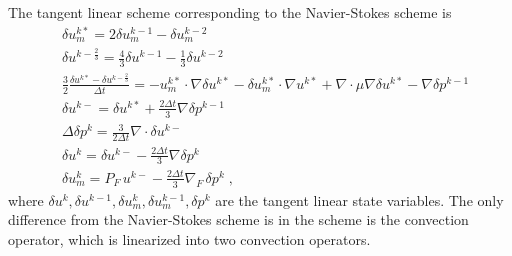 The tangent linear scheme corresponding to the Navier-Stokes scheme is
\begin{equation} \begin{split} \label{tangentscheme}
 &  \delta u_m^{k*} = 2 \delta u_m^{k-1} - \delta u_m^{k-2} \\
 &  \delta u^{k-\frac23} = \frac43 \delta u^{k-1} - \frac13 \delta u^{k-2} \\
 &  \frac32 \frac{\delta u^{k*} - \delta u^{k-\frac23}}{\Delta t} =
 - u_m^{k*} \cdot \nabla \delta u^{k*} - \delta u_m^{k*} \cdot \nabla u^{k*}
 + \nabla \cdot \mu \nabla \delta u^{k*} - \nabla \delta p^{k-1} \\
 & \delta u^{k-} = \delta u^{k*} + \frac{2 \Delta t}{3} \nabla \delta p^{k-1} \\
 & \Delta \delta p^k = \frac{3}{2 \Delta t} \nabla \cdot \delta u^{k-} \\
 & \delta u^k = \delta u^{k-} - \frac{2 \Delta t}{3} \nabla \delta p^k \\
 & \delta u_m^k = P_F\, u^{k-} - \frac{2\Delta t}{3} \nabla_F\, \delta p^k \;,
\end{split} \end{equation}
where $\delta u^k, \delta u^{k-1}, \delta u_m^k, \delta u_m^{k-1}, \delta p^k$
are the tangent linear state variables.  The only difference from the
Navier-Stokes scheme is in the scheme is the convection operator, which is
linearized into two convection operators.

